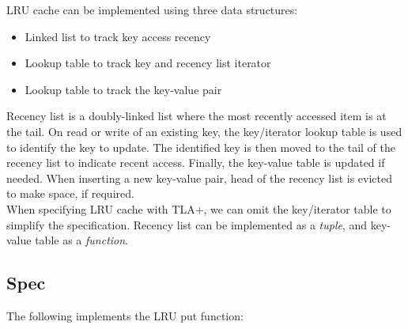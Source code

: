 LRU cache can be implemented using three data structures: 
\begin{itemize}
    \item Linked list to track key access recency 
    \item Lookup table to track key and recency list iterator 
    \item Lookup table to track the key-value pair
\end{itemize}

Recency list is a doubly-linked list where the most recently accessed item is at
the tail. On read or write of an existing key, the key/iterator lookup table is
used to identify the key to update. The identified key is then moved to the tail
of the recency list to indicate recent access. Finally, the key-value table is
updated if needed. When inserting a new key-value pair, head of the recency list
is evicted to make space, if required.\\

When specifying LRU cache with TLA+, we can omit the key/iterator table to
simplify the specification. Recency list can be implemented as a \textit{tuple},
and key-value table as a \textit{function}.\\

\subsection{Spec}

The following implements the LRU put function:\\

